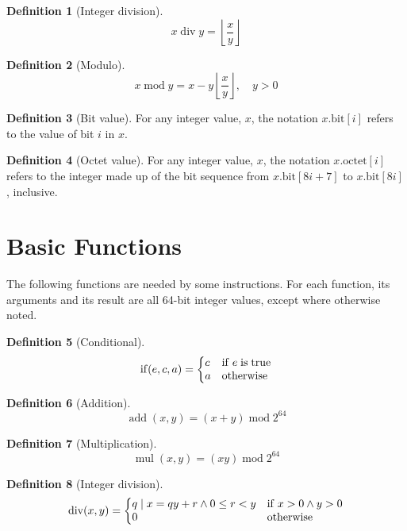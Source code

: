 \documentclass[a4paper,10pt]{article}
\newcommand{\octno}[2]{#1.\mathrm{octet}[#2]}
\newcommand{\bitno}[2]{#1.\mathrm{bit}[#2]}
\DeclareMathOperator{\Mod}{mod}
\DeclareMathOperator{\Add}{add}
\DeclareMathOperator{\Mul}{mul}
\DeclareMathOperator{\Div}{div}
\DeclareMathOperator{\IfThEl}{if}
\newcommand{\modulo}[2]{#1 \Mod #2}
\newcommand{\intdiv}[2]{#1 \Div #2}
\theoremstyle{definition}
\newtheorem{definition}{Definition}
\begin{document}
\begin{definition}[Integer division]
  \[ \intdiv{x}{y} = \left \lfloor \frac{x}{y} \right \rfloor \]
\end{definition}

\begin{definition}[Modulo]
  \[ \modulo{x}{y} = x - y \left \lfloor \frac{x}{y} \right \rfloor, \quad y > 0 \]
\end{definition}

\begin{definition}[Bit value]
For any integer value, $x$, the notation $\bitno{x}{i}$ refers to the value of bit $i$ in $x$.
\end{definition}

\begin{definition}[Octet value]
For any integer value, $x$, the notation $\octno{x}{i}$ refers to the integer made up of the bit sequence from $\bitno{x}{8i+7}$ to $\bitno{x}{8i}$, inclusive.
\end{definition}

\section{Basic Functions}
\label{sec:function-definitions}

The following functions are needed by some instructions.
For each function, its arguments and its result are all 64-bit integer values, except where otherwise noted.

\begin{definition}[Conditional]
  \[ \IfThEl(e, c, a) = \left\{
      \begin{array}{@{}ll@{}}
        c & \mathrm{if} \; e \; \mathrm{is} \; \mathrm{true} \\
        a & \mathrm{otherwise}
      \end{array}
    \right. \]
\end{definition}

\begin{definition}[Addition]
  \[ \Add(x, y) = \modulo{(x + y)}{2^{64}} \]
\end{definition}

\begin{definition}[Multiplication]
  \[ \Mul(x, y) = \modulo{(x y)}{2^{64}} \]
\end{definition}

\begin{definition}[Integer division]
  \[ \Div(x, y) =
    \left\{
      \begin{array}{@{}ll@{}}
        q \mid x = qy + r \wedge 0 \leq r < y & \mathrm{if} \; x > 0 \wedge y > 0 \\
        0 & \textrm{otherwise}
      \end{array}
    \right. \]
\end{definition}
\end{document}
